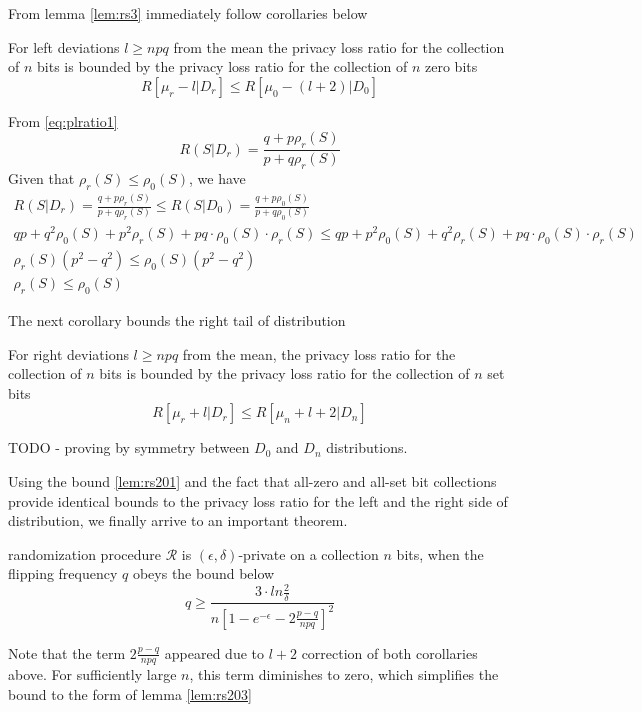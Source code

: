 \documentclass[11pt]{article}
\newcommand{\cR}{\mathcal{R}}
\begin{document}
From lemma \eqref{lem:rs3} immediately follow corollaries below
\begin{cor}
For left deviations $l \ge npq$ from the mean the privacy loss ratio for the collection of $n$ bits is bounded by the privacy loss ratio for the collection of $n$ zero bits
\[ R[\mu_r - l|D_r] \le R[\mu_0 - (l+2)|D_0] \]
\end{cor}
\begin{pf}
From  \eqref{eq:plratio1} \[ R(S|D_r) = \frac{q + p\rho_r(S)}{p + q\rho_r(S)} \] 
Given that $\rho_r(S) \le \rho_0(S)$, we have 
\begin{align*}
R(S|D_r) = \frac{q + p\rho_r(S)}{p + q\rho_r(S)} \le R(S|D_0) = \frac{q + p\rho_0(S)}{p + q\rho_0(S)} \\
qp + q^2\rho_0(S) + p^2 \rho_r(S) + pq \cdot \rho_0(S) \cdot \rho_r(S) \le qp + p^2\rho_0(S) + q^2 \rho_r(S) + pq \cdot \rho_0(S) \cdot \rho_r(S) \\
\rho_r(S) (p^2 - q^2) \le \rho_0(S) (p^2 - q^2)  \\
\rho_r(S) \le \rho_0(S)
\end{align*} 
\end{pf}

The next corollary bounds the right tail of distribution
\begin{cor}
For right deviations $l \ge npq$ from the mean, the privacy loss ratio for the collection of $n$ bits is bounded by the privacy loss ratio for the collection of $n$ set bits
\[ R[\mu_r + l|D_r] \le R[\mu_n + l+2 |D_n] \]
\end{cor}
\begin{pf}
TODO - proving by symmetry between $D_0$ and $D_n$ distributions. 
\end{pf}

Using the bound \eqref{lem:rs201} and the fact that all-zero and all-set bit collections provide identical bounds to the privacy loss ratio for the left and the right side of distribution, we finally arrive to an important theorem.
\begin{prop}
randomization procedure $\cR$ is $(\epsilon, \delta)$-private on a collection $n$ bits, when the flipping frequency $q$ obeys the bound below
\begin{equation} \label{eq:fullbound}
q \ge  \frac { 3 \cdot ln\frac{2}{\delta}} { n \left [ 1 - e^{-\epsilon} - 2 \frac{p-q}{npq} \right ]^2 }
\end{equation}
\end{prop}
Note that the term $2 \frac{p-q}{npq}$ appeared due to $l+2$ correction of both corollaries above.  For sufficiently large $n$, this term diminishes to zero, which simplifies the bound to the form of lemma  \eqref{lem:rs203}
\end{document}

